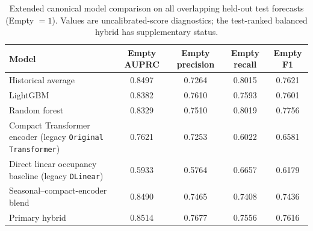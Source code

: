 \begin{table}[!t]
\caption{Extended canonical model comparison on all overlapping held-out test forecasts (Empty $=1$). Values are uncalibrated-score diagnostics; the test-ranked balanced hybrid has supplementary status.}
\label{tab:extended-forecasts}
\centering
\footnotesize
\setlength{\tabcolsep}{2pt}
\begin{tabular}{p{}cccc}
\toprule
Model & Empty AUPRC & Empty precision & Empty recall & Empty F1 \\
\midrule
Historical average & 0.8497 & 0.7264 & 0.8015 & 0.7621 \\
LightGBM & 0.8382 & 0.7610 & 0.7593 & 0.7601 \\
Random forest & 0.8329 & 0.7510 & 0.8019 & 0.7756 \\
Compact Transformer encoder (legacy \texttt{Original Transformer}) & 0.7621 & 0.7253 & 0.6022 & 0.6581 \\
Direct linear occupancy baseline (legacy \texttt{DLinear}) & 0.5933 & 0.5764 & 0.6657 & 0.6179 \\
Seasonal--compact-encoder blend & 0.8490 & 0.7465 & 0.7408 & 0.7436 \\
Primary hybrid & 0.8514 & 0.7677 & 0.7556 & 0.7616 \\
\bottomrule
\end{tabular}
\end{table}

